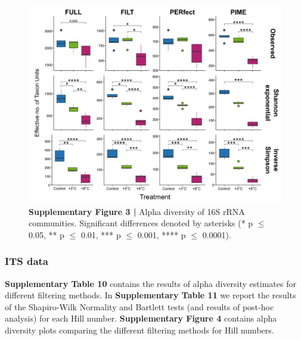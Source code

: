 \documentclass[
  10pt,
  letterpaper,
  DIV=11,
  numbers=noendperiod]{scrartcl}
\begin{document}
\begin{figure}

{\centering \includegraphics[width=1\textwidth,height=\textheight]{FIGURES/ssu_supp_alpha_div.png}

}

\caption{\textbf{Supplementary Figure 3 |} Alpha diversity of 16S rRNA
communities. Significant differences denoted by asterisks (* p \(\le\)
0.05, ** p \(\le\) 0.01, *** p \(\le\) 0.001, **** p \(\le\) 0.0001).}

\end{figure}

\newpage{}

\hypertarget{its-data-2}{%
\subsubsection{ITS data}\label{its-data-2}}

\textbf{Supplementary Table 10} contains the results of alpha diversity
estimates for different filtering methods. In \textbf{Supplementary
Table 11} we report the results of the Shapiro-Wilk Normality and
Bartlett tests (and results of post-hoc analysis) for each Hill number.
\textbf{Supplementary Figure 4} contains alpha diversity plots comparing
the different filtering methods for Hill numbers.
\end{document}
